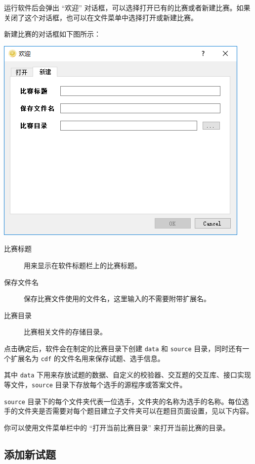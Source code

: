 \documentclass[12pt, a4paper]{article}
\begin{document}
运行软件后会弹出 “欢迎” 对话框，可以选择打开已有的比赛或者新建比赛。如果关闭了这个对话框，也可以在文件菜单中选择打开或新建比赛。

新建比赛的对话框如下图所示：

\begin{center}
\includegraphics[scale=0.7]{pic/newcontest.png}
\end{center}

\begin{description}
\item[比赛标题] 用来显示在软件标题栏上的比赛标题。
\item[保存文件名] 保存比赛文件使用的文件名，这里输入的不需要附带扩展名。
\item[比赛目录] 比赛相关文件的存储目录。  
\end{description}

点击确定后，软件会在制定的比赛目录下创建 \texttt{data} 和 \texttt{source} 目录，同时还有一个扩展名为 \texttt{cdf} 的文件名用来保存试题、选手信息。

其中 \texttt{data} 下用来存放试题的数据、自定义的校验器、交互题的交互库、接口实现等文件，\texttt{source} 目录下存放每个选手的源程序或答案文件。

\texttt{source} 目录下的每个文件夹代表一位选手，文件夹的名称为选手的名称。每位选手的文件夹是否需要对每个题目建立子文件夹可以在题目页面设置，见以下内容。

你可以使用文件菜单栏中的 “打开当前比赛目录” 来打开当前比赛的目录。

\subsection{添加新试题}
\end{document}
